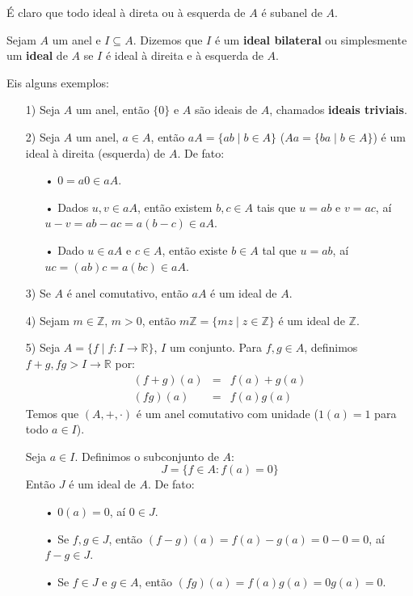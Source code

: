 \documentclass[11pt,twoside,a4paper]{book}
\begin{document}
\noindent
É claro que todo ideal à direta ou à esquerda de $A$ é subanel de $A$.

\begin{definicao}
Sejam $A$ um anel e $I\subseteq A$. Dizemos que $I$ é um \textbf{ideal bilateral} ou simplesmente um \textbf{ideal} de $A$ se $I$ é ideal à direita e à esquerda de $A$.
\end{definicao}

\begin{exemplo}
Eis alguns exemplos:
\begin{itemize}
\item[1)] Seja $A$ um anel, então $\{0\}$ e $A$ são ideais de $A$, chamados \textbf{ideais triviais}.
\item[2)] Seja $A$ um anel, $a\in A$, então $aA=\{ab\mid b\in A\}$ ($Aa=\{ba\mid b\in A\}$) é um ideal à direita (esquerda) de $A$. De fato:
\begin{itemize}
\item[•] $0=a0\in aA$.
\item[•] Dados $u,v\in aA$, então existem $b,c\in A$ tais que $u=ab$ e $v=ac$, aí $u-v=ab-ac=a(b-c)\in aA$.
\item[•] Dado $u\in aA$ e $c\in A$, então existe $b\in A$ tal que $u=ab$, aí $uc=(ab)c=a(bc)\in aA$.
\end{itemize}
\item[3)] Se $A$ é anel comutativo, então $aA$ é um ideal de $A$.
\item[4)] Sejam $m\in\mathbb{Z}$, $m>0$, então $m\mathbb{Z}=\{mz\mid z\in\mathbb{Z}\}$ é um ideal de $\mathbb{Z}$.
\item[5)] Seja $A=\{f\mid f:I\rightarrow\mathbb{R}\}$, $I$ um conjunto. Para $f,g\in A$, definimos $f+g,fg>I\rightarrow\mathbb{R}$ por:
\[
\begin{array}{rcl}
(f+g)(a)&=&f(a)+g(a)\\
(fg)(a)&=&f(a)g(a)
\end{array}
\]
Temos que $(A,+,\cdot)$ é um anel comutativo com unidade ($1(a)=1$ para todo $a\in I$).

\medskip
\noindent
Seja $a\in I$. Definimos o subconjunto de $A$:
\[
J=\{f\in A:f(a)=0\}
\]
Então $J$ é um ideal de $A$. De fato:
\begin{itemize}
\item[•] $0(a)=0$, aí $0\in J$.
\item[•] Se $f,g\in J$, então $(f-g)(a)=f(a)-g(a)=0-0=0$, aí $f-g\in J$.
\item[•] Se $f\in J$ e $g\in A$, então $(fg)(a)=f(a)g(a)=0g(a)=0$.
\end{itemize}
\end{itemize}
\end{exemplo}
\end{document}
